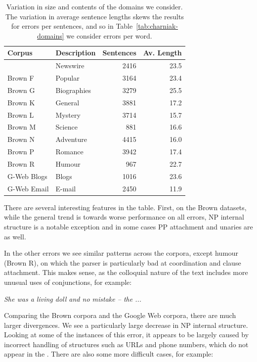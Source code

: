 \begin{table}
\begin{center}
\begin{tabular}{|llrr|}
	\hline
		Corpus & Description & Sentences & Av. Length \\
	\hline
	\hline
		\wsj 23 & Newswire & 2416 & 23.5 \\
		Brown F & Popular & 3164 & 23.4 \\
		Brown G & Biographies & 3279 & 25.5 \\
		Brown K & General & 3881 & 17.2 \\
		Brown L & Mystery & 3714 & 15.7 \\
		Brown M & Science & 881 & 16.6 \\
		Brown N & Adventure & 4415 & 16.0 \\
		Brown P & Romance & 3942 & 17.4 \\
		Brown R & Humour & 967 & 22.7 \\
		G-Web Blogs & Blogs & 1016 & 23.6 \\
		G-Web Email & E-mail & 2450 & 11.9 \\
	\hline
\end{tabular}
\caption{
	\label{tab:domain-info}
	Variation in size and contents of the domains we consider.	The variation in
	average sentence lengths skews the results for errors per sentences, and so
	in Table~\ref{tab:charniak-domains} we consider errors per word.
}
\end{center}
\end{table}

There are several interesting features in the table.  First, on the Brown
datasets, while the general trend is towards worse performance on all errors,
NP internal structure is a notable exception and in some cases PP attachment
and unaries are as well.

In the other errors we see similar patterns across the corpora, except humour
(Brown R), on which the parser is particularly bad at coordination and clause
attachment.  This makes sense, as the colloquial nature of the text includes
more unusual uses of conjunctions, for example:

\vspace{3mm}
\emph{She was a living doll and no mistake -- the ... }
\vspace{3mm}

Comparing the Brown corpora and the Google Web corpora, there are much larger
divergences.  We see a particularly large decrease in NP internal structure.
Looking at some of the instances of this error, it appears to be largely caused
by incorrect handling of structures such as URLs and phone numbers, which do
not appear in the \ptb.  There are also some more difficult cases, for example:

